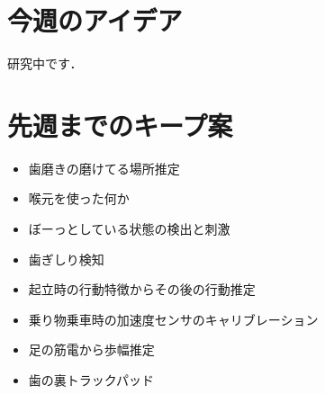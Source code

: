 \documentclass[a4j,10pt]{jarticle}
\begin{document}
\begin{multicols}{2}
  \section{今週のアイデア}
  研究中です．

  \section{先週までのキープ案}
  \begin{itemize}
    \item 歯磨きの磨けてる場所推定
    \item 喉元を使った何か
    \item ぼーっとしている状態の検出と刺激
    \item 歯ぎしり検知
    \item 起立時の行動特徴からその後の行動推定
    \item 乗り物乗車時の加速度センサのキャリブレーション
    \item 足の筋電から歩幅推定
    \item 歯の裏トラックパッド
  \end{itemize}



\end{multicols}
\end{document}
